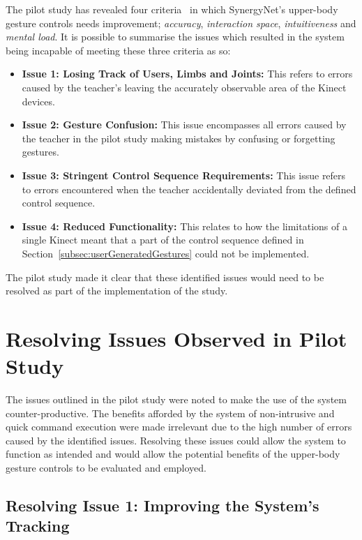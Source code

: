 \documentclass[link]{IWCOMP}
\begin{document}
The pilot study has revealed four criteria~\citep{Wachs2011} in which SynergyNet's upper-body gesture controls needs improvement; 
\textit{accuracy}, \textit{interaction space}, \textit{intuitiveness} and \textit{mental load}.
It is possible to summarise the issues which resulted in the system being incapable of meeting these three criteria as so:

\begin{itemize}
\item \textbf{Issue 1: Losing Track of Users, Limbs and Joints:}
This refers to errors caused by the teacher's leaving the accurately observable area of the Kinect devices.
\item \textbf{Issue 2: Gesture Confusion:}
This issue encompasses all errors caused by the teacher in the pilot study making mistakes by confusing or forgetting gestures.
\item \textbf{Issue 3: Stringent Control Sequence Requirements:}
This issue refers to errors encountered when the teacher accidentally deviated from the defined control sequence.
\item \textbf{Issue 4: Reduced Functionality:}
This relates to how the limitations of a single Kinect meant that a part of the control sequence defined in Section~\ref{subsec:userGeneratedGestures} could not be implemented.
\end{itemize}

The pilot study made it clear that these identified issues would need to be resolved as part of the implementation of the study.

\section{Resolving Issues Observed in Pilot Study}
\label{sec:resolvingIssuesObserved}

The issues outlined in the pilot study were noted to make the use of the system counter-productive.
The benefits afforded by the system of non-intrusive and quick command execution were made irrelevant due to the high number of errors caused by the identified issues.
Resolving these issues could allow the system to function as intended and would allow the potential benefits of the upper-body gesture controls to be evaluated and employed.

\subsection{Resolving Issue 1: Improving the System's Tracking}
\label{subsec:resolvingIssuesObserved1}
\end{document}
